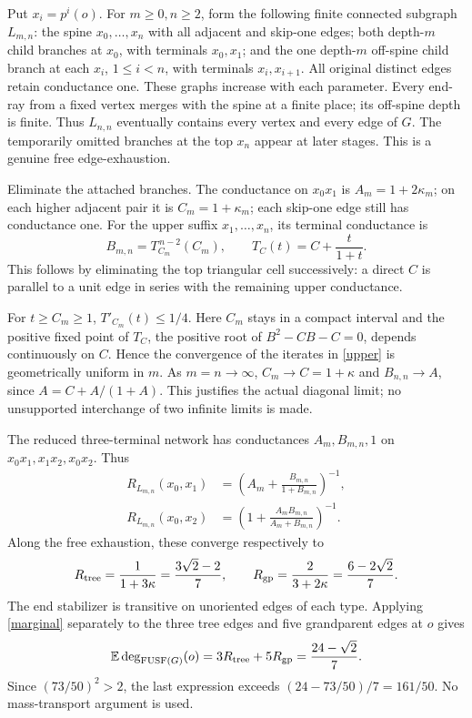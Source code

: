\documentclass[11pt]{article}
\theoremstyle{remark}\newtheorem{remark}[theorem]{Remark}
\newcommand{\FUSF}{\operatorname{FUSF}}
\newcommand{\E}{\mathbb E}
\begin{document}
Put \(x_i=p^i(o)\).
For \(m\ge0,n\ge2\), form the following finite connected subgraph \(L_{m,n}\):
the spine \(x_0,\ldots,x_n\) with all adjacent and skip-one edges;
both depth-\(m\) child branches at \(x_0\), with terminals \(x_0,x_1\);
and the one depth-\(m\) off-spine child branch at each \(x_i\),
\(1\le i<n\), with terminals \(x_i,x_{i+1}\).
All original distinct edges retain conductance one.
These graphs increase with each parameter.
Every end-ray from a fixed vertex merges with the spine at a finite place;
its off-spine depth is finite. Thus \(L_{n,n}\) eventually contains every
vertex and every edge of \(G\). The temporarily omitted branches at the
top \(x_n\) appear at later stages. This is a genuine free edge-exhaustion.

Eliminate the attached branches. The conductance on \(x_0x_1\) is
\(A_m=1+2\kappa_m\); on each higher adjacent pair it is
\(C_m=1+\kappa_m\); each skip-one edge still has conductance one.
For the upper suffix \(x_1,\ldots,x_n\), its terminal conductance is
\begin{equation}\label{upper}
 B_{m,n}=T_{C_m}^{\,n-2}(C_m),\qquad
 T_C(t)=C+\frac{t}{1+t}.
\end{equation}
This follows by eliminating the top triangular cell successively:
a direct \(C\) is parallel to a unit edge in series with the remaining
upper conductance.

For \(t\ge C_m\ge1\), \(T'_{C_m}(t)\le1/4\).
Here \(C_m\) stays in a compact interval and the positive fixed point
of \(T_C\), the positive root of \(B^2-CB-C=0\), depends continuously on
\(C\). Hence the convergence of the iterates in \eqref{upper} is
geometrically uniform in \(m\).
As \(m=n\to\infty\), \(C_m\to C=1+\kappa\) and \(B_{n,n}\to A\),
since \(A=C+A/(1+A)\). This justifies the actual diagonal limit;
no unsupported interchange of two infinite limits is made.

The reduced three-terminal network has conductances \(A_m,B_{m,n},1\)
on \(x_0x_1,x_1x_2,x_0x_2\). Thus
\begin{align}
 R_{L_{m,n}}(x_0,x_1)&=
 \left(A_m+\frac{B_{m,n}}{1+B_{m,n}}\right)^{-1},\label{tri1}\\
 R_{L_{m,n}}(x_0,x_2)&=
 \left(1+\frac{A_mB_{m,n}}{A_m+B_{m,n}}\right)^{-1}.\label{tri2}
\end{align}
Along the free exhaustion, these converge respectively to
\begin{equation}\label{res}
 R_{\rm tree}=\frac1{1+3\kappa}=\frac{3\sqrt2-2}{7},
 \qquad
 R_{\rm gp}=\frac2{3+2\kappa}=\frac{6-2\sqrt2}{7}.
\end{equation}
The end stabilizer is transitive on unoriented edges of each type.
Applying \eqref{marginal} separately to the three tree edges and five
grandparent edges at \(o\) gives
\[
 \E\deg_{\FUSF(G)}(o)=3R_{\rm tree}+5R_{\rm gp}
                  =\frac{24-\sqrt2}{7}.
\]
Since \((73/50)^2>2\), the last expression exceeds
\((24-73/50)/7=161/50\). No mass-transport argument is used.
\end{document}
